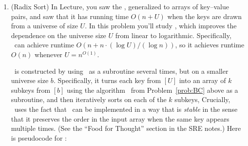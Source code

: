 \documentclass[11pt]{article}
\begin{document}
\begin{enumerate}
\begin{enumerate}
\item Describe the computational problem $\Pi$ in words.  (You may find it useful to try some more examples with $b=10$.) 

\item Is there any $x\in \Inputs$ for which $f(x)=\emptyset$? If so, give an example; if not, explain why.

\item For each possible input $x\in \Inputs$, what is $|f(x)|$? ($|A|$ is the size of a set $A$.) Justify your answer(s) in one or two sentences.

\item Let $\Pi'=(\Inputs,\Outputs,f')$ be the problem with the same $\Inputs$ and $\Outputs$ as $\Pi$, but $f'(n,b,k) = f(n,b,k) \cup \{(0,1, \ldots,k-1)\}$. Does every algorithm $A$ that solves $\Pi$ also solve $\Pi'$? (Hint: any differences between inputs that were relevant in the previous subproblem are worth considering here.) Justify your answer with a proof or a counterexample.

\end{enumerate}
\newpage

\item (Radix Sort) In Lecture, you saw the \SingletonBucketSort, generalized to arrays of key--value pairs, and saw that it has running time $O(n+U)$ when the keys are drawn from a universe of size $U$. In this problem you'll study {\em \RadixSort}, which improves the dependence on the universe size $U$ from linear to logarithmic.  Specifically, \RadixSort\ can achieve runtime $O(n+n\cdot (\log U)/(\log n))$, so it achieves runtime $O(n)$ whenever $U = n^{O(1)}$.  

\RadixSort\ is constructed by using \SingletonBucketSort\ as a subroutine several times, but on a smaller universe size $b$.  Specifically, it turns each key from $[U]$ into an array of $k$ subkeys from $[b]$ using the algorithm \BC\ from Problem~\ref{prob:BC} above as a subroutine, and then iteratively sorts on each of the $k$ subkeys,
Crucially, \RadixSort\ uses the fact that \SingletonBucketSort\ can be implemented in a way that is {\em stable} in the sense that it preserves the order in the input array when the same key appears multiple times.  (See the ``Food for Thought'' section in the SRE notes.)  Here is pseudocode for \RadixSort:



\end{enumerate}
\end{document}
